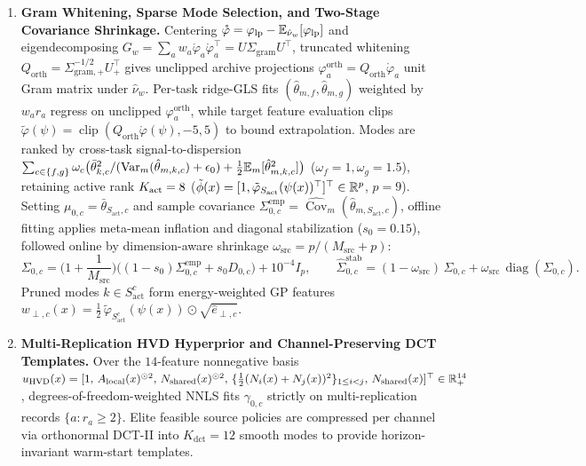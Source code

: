 \begin{enumerate}
  \item \textbf{Gram Whitening, Sparse Mode Selection, and Two-Stage Covariance Shrinkage.} Centering $\mathring{\varphi} = \varphi_{\mathrm{lp}} - \mathbb{E}_{\hat{\nu}_w}[\varphi_{\mathrm{lp}}]$ and eigendecomposing $G_w = \sum_a w_a \mathring{\varphi}_a \mathring{\varphi}_a^\top = U\Sigma_{\mathrm{gram}} U^\top$, truncated whitening $Q_{\mathrm{orth}} = \Sigma_{\mathrm{gram},+}^{-1/2}U_+^\top$ gives unclipped archive projections $\varphi_a^{\mathrm{orth}} = Q_{\mathrm{orth}}\mathring{\varphi}_a$ unit Gram matrix under $\hat{\nu}_w$. Per-task ridge-GLS fits $(\hat{\theta}_{m,f}, \hat{\theta}_{m,g})$ weighted by $w_a r_a$ regress on unclipped $\varphi_a^{\mathrm{orth}}$, while target feature evaluation clips $\tilde{\varphi}(\psi) = \operatorname{clip}(Q_{\mathrm{orth}}\mathring{\varphi}(\psi), -5, 5)$ to bound extrapolation. Modes are ranked by cross-task signal-to-dispersion $\sum_{c \in \{f,g\}} \omega_c \big(\bar{\theta}_{k,c}^2 / (\operatorname{Var}_m(\hat{\theta}_{m,k,c}) + \epsilon_0) + \tfrac{1}{2}\mathbb{E}_m[\hat{\theta}_{m,k,c}^2]\big)$ ($\omega_f = 1, \omega_g = 1.5$), retaining active rank $K_{\mathrm{act}} = 8$ ($\tilde{\phi}(x) = [1, \tilde{\varphi}_{S_{\mathrm{act}}}(\psi(x))^\top]^\top \in \mathbb{R}^{p}$, $p = 9$). Setting $\mu_{0,c} = \bar{\theta}_{S_{\mathrm{act}},c}$ and sample covariance $\Sigma_{0,c}^{\mathrm{emp}} = \widehat{\operatorname{Cov}}_m(\hat{\theta}_{m,S_{\mathrm{act}},c})$, offline fitting applies meta-mean inflation and diagonal stabilization ($s_0 = 0.15$), followed online by dimension-aware shrinkage $\omega_{\mathrm{src}} = p / (M_{\mathrm{src}} + p)$:
  \begin{equation}\label{eq:finite_source_cov}
    \Sigma_{0,c} = \Big(1 + \frac{1}{M_{\mathrm{src}}}\Big)\big((1 - s_0)\Sigma_{0,c}^{\mathrm{emp}} + s_0 D_{0,c}\big) + 10^{-4} I_p,
    \qquad
    \widehat{\Sigma}_{0,c}^{\mathrm{stab}} = (1 - \omega_{\mathrm{src}})\,\Sigma_{0,c} + \omega_{\mathrm{src}}\,\operatorname{diag}(\Sigma_{0,c}).
  \end{equation}
  Pruned modes $k \in S_{\mathrm{act}}^c$ form energy-weighted GP features $w_{\perp,c}(x) = \tfrac{1}{2}\,\tilde{\varphi}_{S_{\mathrm{act}}^c}(\psi(x)) \odot \sqrt{\hat{e}_{\perp,c}}$.

  \item \textbf{Multi-Replication HVD Hyperprior and Channel-Preserving DCT Templates.} Over the $14$-feature nonnegative basis $u_{\mathrm{HVD}}(x) = [1,\, A_{\mathrm{local}}(x)^{\odot 2},\, N_{\mathrm{shared}}(x)^{\odot 2},\, \{\tfrac{1}{2}(N_i(x)+N_j(x))^2\}_{1 \le i < j},\, N_{\mathrm{shared}}(x)]^\top \in \mathbb{R}_+^{14}$, degrees-of-freedom-weighted NNLS fits $\gamma_{0,c}$ strictly on multi-replication records $\{a : r_a \ge 2\}$. Elite feasible source policies are compressed per channel via orthonormal DCT-II into $K_{\mathrm{dct}} = 12$ smooth modes to provide horizon-invariant warm-start templates.
\end{enumerate}
